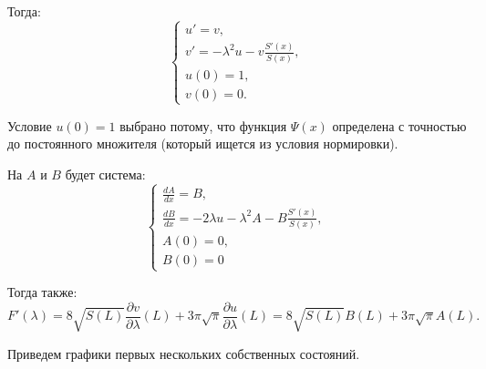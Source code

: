 		Тогда:
		\begin{equation*}
			\begin{cases}
				u' = v, \\
				v' = -\lambda^2 u - v \frac{S'(x)}{S(x)}, \\
				u(0) = 1, \\
				v(0) = 0.
			\end{cases}
		\end{equation*}
		
		Условие $u(0) = 1$ выбрано потому, что функция $\Psi(x)$ определена с точностью до постоянного множителя (который ищется из условия нормировки).
		
		На $A$ и $B$ будет система:
		\begin{equation*}
			\begin{cases}
				\frac{dA}{dx} = B, \\
				\frac{dB}{dx} = -2\lambda u - \lambda^2 A - B\frac{S'(x)}{S(x)}, \\
				A(0) = 0, \\
				B(0) = 0
			\end{cases}
		\end{equation*}
	
		Тогда также:
		\begin{equation*}
			F'(\lambda) = 8\sqrt{S(L)}\frac{\partial v}{\partial \lambda}(L) + 3\pi\sqrt{\pi}\frac{\partial u}{\partial \lambda}(L) = 8\sqrt{S(L)} B(L) + 3\pi\sqrt{\pi} A(L).
		\end{equation*}
		
		
		Приведем графики первых нескольких собственных состояний.
		
